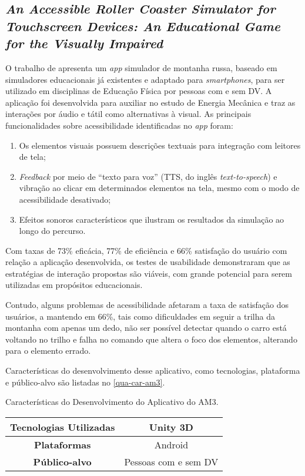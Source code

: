 \subsection{\emph{An Accessible Roller Coaster Simulator for Touchscreen Devices: An Educational Game for the Visually Impaired}}

O trabalho de  apresenta um \emph{app} simulador de montanha russa, baseado em simuladores educacionais já existentes
e adaptado para \emph{smartphones}, para ser utilizado em disciplinas de Educação Física por pessoas com e sem DV\@.
A aplicação foi desenvolvida para auxiliar no estudo de Energia Mecânica e traz as interações por áudio e tátil como alternativas à visual.
As principais funcionalidades sobre acessibilidade identificadas no \emph{app} foram:

\begin{enumerate}
  \item Os elementos visuais possuem descrições textuais para integração com leitores de tela;
  \item \emph{Feedback} por meio de ``texto para voz'' (TTS, do inglês \emph{text-to-speech}) e vibração ao clicar em determinados elementos
        na tela, mesmo com o modo de acessibilidade desativado;
  \item Efeitos sonoros característicos que ilustram os resultados da simulação ao longo do percurso.
\end{enumerate}

Com taxas de 73\% eficácia, 77\% de eficiência e 66\% satisfação do usuário com relação a aplicação desenvolvida, os testes de usabilidade
demonstraram que as estratégias de interação propostas são viáveis, com grande potencial para serem utilizadas em propósitos educacionais.

Contudo, alguns problemas de acessibilidade afetaram a taxa de satisfação dos usuários, a mantendo em 66\%, tais como
dificuldades em seguir a trilha da montanha com apenas um dedo, não ser possível detectar quando o carro está voltando
no trilho e falha no comando que altera o foco dos elementos, alterando para o elemento errado.

Características do desenvolvimento desse aplicativo, como tecnologias, plataforma e público-alvo são listadas
no \autoref{qua-car-am3}.

\begin{quadro}[htb!]
  \caption{\label{qua-car-am3}Características do Desenvolvimento do Aplicativo do AM3.}
  \begin{tabular}{|c|c|}
    \hline
    \textbf{Tecnologias Utilizadas} & Unity 3D             \\ \hline
    \textbf{Plataformas}            & Android              \\ \hline
    \textbf{Público-alvo}           & Pessoas com e sem DV \\
    \hline
  \end{tabular}
\end{quadro}

